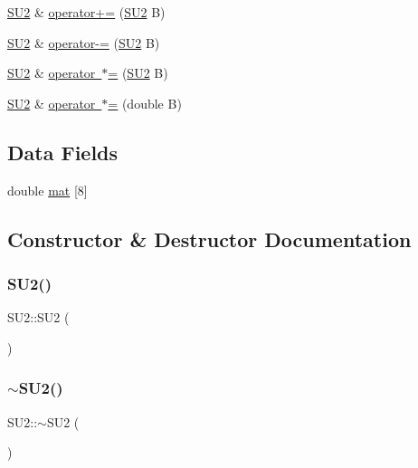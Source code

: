 \begin{DoxyCompactItemize}
\mbox{\hyperlink{class_s_u2}{S\+U2}} \& \mbox{\hyperlink{class_s_u2_a36436ebbcc798eca5a5b1927038517c4}{operator+=}} (\mbox{\hyperlink{class_s_u2}{S\+U2}} B)
\item 
\mbox{\hyperlink{class_s_u2}{S\+U2}} \& \mbox{\hyperlink{class_s_u2_af1d50a5dec3c4dc888109e688bb9ec88}{operator-\/=}} (\mbox{\hyperlink{class_s_u2}{S\+U2}} B)
\item 
\mbox{\hyperlink{class_s_u2}{S\+U2}} \& \mbox{\hyperlink{class_s_u2_abf6e0365b7e284dfbf5a5ad228aadacd}{operator $\ast$=}} (\mbox{\hyperlink{class_s_u2}{S\+U2}} B)
\item 
\mbox{\hyperlink{class_s_u2}{S\+U2}} \& \mbox{\hyperlink{class_s_u2_a592fd0456666ba1e70abc4b31f9623b0}{operator $\ast$=}} (double B)
\end{DoxyCompactItemize}
\subsection*{Data Fields}
\begin{DoxyCompactItemize}
\item 
double \mbox{\hyperlink{class_s_u2_ad4227484be245b63489c44a2bc02a625}{mat}} \mbox{[}8\mbox{]}
\end{DoxyCompactItemize}


\subsection{Constructor \& Destructor Documentation}
\mbox{\label{class_s_u2_a681fd5c1304d6f160686d7e9c0842ecb}} 
\subsubsection{\texorpdfstring{SU2()}{SU2()}}
{\footnotesize\ttfamily S\+U2\+::\+S\+U2 (\begin{DoxyParamCaption}{ }\end{DoxyParamCaption})\hspace{0.3cm}{\ttfamily [inline]}}

\mbox{\label{class_s_u2_a966f54ae31784aba31580b4569d83e1f}} 
\subsubsection{\texorpdfstring{$\sim$SU2()}{~SU2()}}
{\footnotesize\ttfamily S\+U2\+::$\sim$\+S\+U2 (\begin{DoxyParamCaption}{ }\end{DoxyParamCaption})\hspace{0.3cm}{\ttfamily [inline]}}



